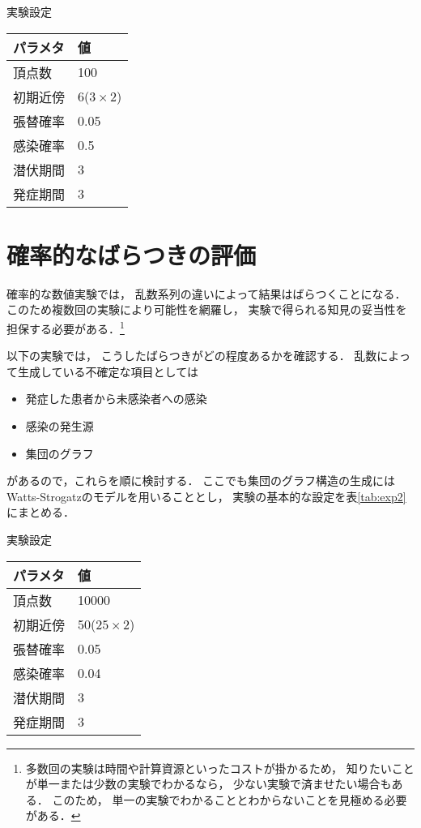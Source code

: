 \documentclass[10pt,oneside]{scrartcl}
\begin{document}
\begin{margintable}
  \caption{実験設定}
  \label{tab:exp1}
  \small
  \begin{tabular}{ll}
    \toprule
    パラメタ&値 \\
    \midrule
    頂点数&100 \\
    初期近傍&6\;($3\times2$) \\
    張替確率&0.05 \\
    感染確率&0.5 \\
    潜伏期間&3 \\
    発症期間&3 \\
    \bottomrule
  \end{tabular}
\end{margintable}

\section{確率的なばらつきの評価}
\label{sec:org1939554}

確率的な数値実験では，
乱数系列の違いによって結果はばらつくことになる．
このため複数回の実験により可能性を網羅し，
実験で得られる知見の妥当性を担保する必要がある．\footnote{多数回の実験は時間や計算資源といったコストが掛かるため，
知りたいことが単一または少数の実験でわかるなら，
少ない実験で済ませたい場合もある．
このため，
単一の実験でわかることとわからないことを見極める必要がある．}

以下の実験では，
こうしたばらつきがどの程度あるかを確認する．
乱数によって生成している不確定な項目としては
\begin{itemize}
\item 発症した患者から未感染者への感染
\item 感染の発生源
\item 集団のグラフ
\end{itemize}
があるので，これらを順に検討する．
ここでも集団のグラフ構造の生成には
Watts-Strogatzのモデルを用いることとし，
実験の基本的な設定を表\ref{tab:exp2}にまとめる．

\begin{margintable}
  \caption{実験設定}
  \label{tab:exp2}
  \small
  \begin{tabular}{ll}
    \toprule
    パラメタ&値 \\
    \midrule
    頂点数&10000 \\
    初期近傍&50\;($25\times2$) \\
    張替確率&0.05 \\
    感染確率&0.04 \\
    潜伏期間&3 \\
    発症期間&3 \\
    \bottomrule
  \end{tabular}
\end{margintable}
\end{document}

